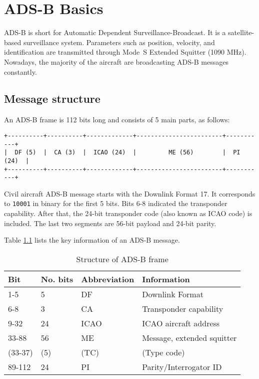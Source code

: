 \chapter{ADS-B Basics} \label{chap:adsb-basic}
ADS-B is short for Automatic Dependent Surveillance-Broadcast. It is a satellite-based surveillance system. Parameters such as position, velocity, and identification are transmitted through Mode~S Extended Squitter (1090 MHz). Nowadays, the majority of the aircraft are broadcasting ADS-B messages constantly.

\section{Message structure}

An ADS-B frame is 112 bits long and consists of 5 main parts, as follows:

\begin{verbatim}
+----------+----------+-------------+------------------------+-----------+
|  DF (5)  |  CA (3)  |  ICAO (24)  |         ME (56)        |  PI (24)  |
+----------+----------+-------------+------------------------+-----------+
\end{verbatim}

Civil aircraft ADS-B message starts with the Downlink Format 17. It corresponds to \texttt{10001} in binary for the first 5 bits. Bits 6-8 indicated the transponder capability. After that, the 24-bit transponder code (also known as ICAO code) is included. The last two segments are 56-bit payload and 24-bit parity.

Table \ref{tb:adsb-structure} lists the key information of an ADS-B message.

\begin{table}[!ht]
\centering
\caption{Structure of ADS-B frame}
\label{tb:adsb-structure}
\begin{tabular}{|l|l|l|l|}
\hline
\textbf{Bit} & \textbf{No. bits} & \textbf{Abbreviation} & \textbf{Information} \\ \hline\hline
1-5 & 5 & DF & Downlink Format \\ \hline
6-8 & 3 & CA & Transponder capability \\ \hline
9-32 & 24 & ICAO & ICAO aircraft address \\ \hline
33-88 & 56 & ME & Message, extended squitter \\
(33-37) & (5) & (TC) & (Type code) \\ \hline
89-112 & 24 & PI & Parity/Interrogator ID \\ \hline
\end{tabular}
\end{table}

